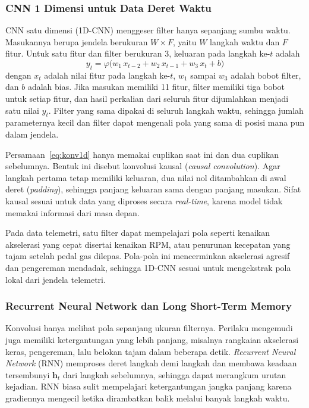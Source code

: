 \subsubsection{CNN 1 Dimensi untuk Data Deret Waktu}
CNN satu dimensi (1D-CNN) menggeser filter hanya sepanjang sumbu waktu. Masukannya berupa jendela berukuran $W \times F$, yaitu $W$ langkah waktu dan $F$ fitur. Untuk satu fitur dan filter berukuran 3, keluaran pada langkah ke-$t$ adalah
\begin{equation}
  y_{t} = \varphi\big(w_{1}\,x_{t-2} + w_{2}\,x_{t-1} + w_{3}\,x_{t} + b\big)
  \label{eq:konv1d}
\end{equation}
dengan $x_{t}$ adalah nilai fitur pada langkah ke-$t$, $w_{1}$ sampai $w_{3}$ adalah bobot filter, dan $b$ adalah bias. Jika masukan memiliki 11 fitur, filter memiliki tiga bobot untuk setiap fitur, dan hasil perkalian dari seluruh fitur dijumlahkan menjadi satu nilai $y_{t}$. Filter yang sama dipakai di seluruh langkah waktu, sehingga jumlah parameternya kecil dan filter dapat mengenali pola yang sama di posisi mana pun dalam jendela.

Persamaan~\ref{eq:konv1d} hanya memakai cuplikan saat ini dan dua cuplikan sebelumnya. Bentuk ini disebut konvolusi kausal (\textit{causal convolution}). Agar langkah pertama tetap memiliki keluaran, dua nilai nol ditambahkan di awal deret (\textit{padding}), sehingga panjang keluaran sama dengan panjang masukan. Sifat kausal sesuai untuk data yang diproses secara \textit{real-time}, karena model tidak memakai informasi dari masa depan.

Pada data telemetri, satu filter dapat mempelajari pola seperti kenaikan akselerasi yang cepat disertai kenaikan RPM, atau penurunan kecepatan yang tajam setelah pedal gas dilepas. Pola-pola ini mencerminkan akselerasi agresif dan pengereman mendadak, sehingga 1D-CNN sesuai untuk mengekstrak pola lokal dari jendela telemetri.

\subsubsection{Recurrent Neural Network dan Long Short-Term Memory}
Konvolusi hanya melihat pola sepanjang ukuran filternya. Perilaku mengemudi juga memiliki ketergantungan yang lebih panjang, misalnya rangkaian akselerasi keras, pengereman, lalu belokan tajam dalam beberapa detik. \textit{Recurrent Neural Network} (RNN) memproses deret langkah demi langkah dan membawa keadaan tersembunyi $\mathbf{h}_{t}$ dari langkah sebelumnya, sehingga dapat merangkum urutan kejadian. RNN biasa sulit mempelajari ketergantungan jangka panjang karena gradiennya mengecil ketika dirambatkan balik melalui banyak langkah waktu.

